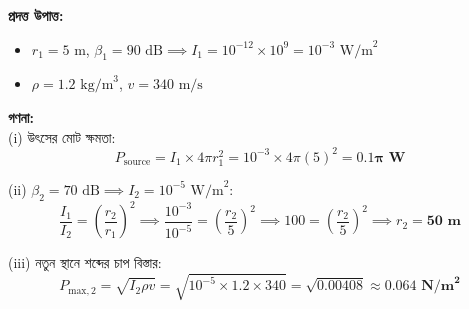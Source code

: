\documentclass[12pt, a4paper]{article}
\begin{document}
\begin{tcolorbox}[solutionbox={সমাধান (Solution)}]
    \noindent
    \textbf{প্রদত্ত উপাত্ত:}
    \begin{itemize}[leftmargin=1.5em, itemsep=0.2em]
        \item $r_1 = 5\text{ m}$, $\beta_1 = 90\text{ dB} \implies I_1 = 10^{-12} \times 10^9 = 10^{-3}\text{ W/m}^2$
        \item $\rho = 1.2\text{ kg/m}^3$, $v = 340\text{ m/s}$
    \end{itemize}

    \vspace{0.6em}
    \noindent\textbf{গণনা:} \\
    (i) উৎসের মোট ক্ষমতা:
    \[ P_{\text{source}} = I_1 \times 4\pi r_1^2 = 10^{-3} \times 4\pi (5)^2 = \mathbf{0.1\pi\text{ W}} \]
    
    (ii) $\beta_2 = 70\text{ dB} \implies I_2 = 10^{-5}\text{ W/m}^2$:
    \[ \frac{I_1}{I_2} = \left(\frac{r_2}{r_1}\right)^2 \implies \frac{10^{-3}}{10^{-5}} = \left(\frac{r_2}{5}\right)^2 \implies 100 = \left(\frac{r_2}{5}\right)^2 \implies r_2 = \mathbf{50\text{ m}} \]
    
    (iii) নতুন স্থানে শব্দের চাপ বিস্তার:
    \[ P_{\text{max},2} = \sqrt{I_2 \rho v} = \sqrt{10^{-5} \times 1.2 \times 340} = \sqrt{0.00408} \approx \mathbf{0.064\text{ N/m}^2} \]
\end{tcolorbox}
\end{document}
